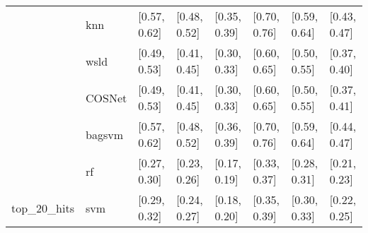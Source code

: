 \begin{table}[H]
{\begin{tabular}{llllllll}
 & knn & [0.57, 0.62] & [0.48, 0.52] & [0.35, 0.39] & [0.70, 0.76] & [0.59, 0.64] & [0.43, 0.47]\\

 & wsld & [0.49, 0.53] & [0.41, 0.45] & [0.30, 0.33] & [0.60, 0.65] & [0.50, 0.55] & [0.37, 0.40]\\

 & COSNet & [0.49, 0.53] & [0.41, 0.45] & [0.30, 0.33] & [0.60, 0.65] & [0.50, 0.55] & [0.37, 0.41]\\

 & bagsvm & [0.57, 0.62] & [0.48, 0.52] & [0.36, 0.39] & [0.70, 0.76] & [0.59, 0.64] & [0.44, 0.47]\\

 & rf & [0.27, 0.30] & [0.23, 0.26] & [0.17, 0.19] & [0.33, 0.37] & [0.28, 0.31] & [0.21, 0.23]\\

\multirow{-15}{*}{\raggedright\arraybackslash top\_20\_hits} & svm & [0.29, 0.32] & [0.24, 0.27] & [0.18, 0.20] & [0.35, 0.39] & [0.30, 0.33] & [0.22, 0.25]\\
\bottomrule
\end{tabular}}
\end{table}
